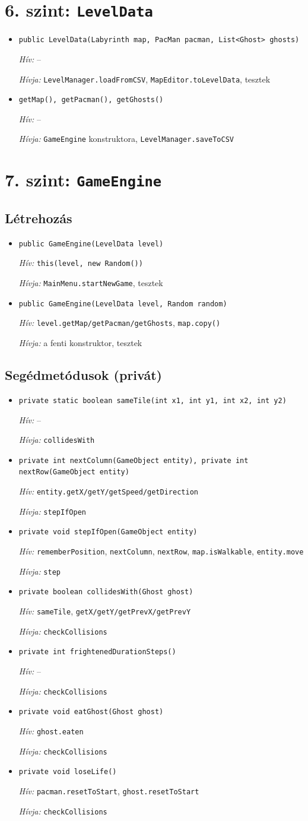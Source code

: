 \documentclass[10pt, a4paper]{article}
\newcommand{\fn}[3]{%
  \item \texttt{#1}\par
  {\small\textit{Hív:} #2\par\textit{Hívja:} #3}\vspace{3pt}}
\newcommand{\none}{--}
\begin{document}
\section{6. szint: \texttt{LevelData}}
\begin{itemize}
\fn{public LevelData(Labyrinth map, PacMan pacman, List<Ghost> ghosts)}{\none}{\texttt{LevelManager.loadFromCSV}, \texttt{MapEditor.toLevelData}, tesztek}
\fn{getMap(), getPacman(), getGhosts()}{\none}{\texttt{GameEngine} konstruktora, \texttt{LevelManager.saveToCSV}}
\end{itemize}

\section{7. szint: \texttt{GameEngine}}
\subsection*{Létrehozás}
\begin{itemize}
\fn{public GameEngine(LevelData level)}{\texttt{this(level, new Random())}}{\texttt{MainMenu.startNewGame}, tesztek}
\fn{public GameEngine(LevelData level, Random random)}{\texttt{level.getMap/getPacman/getGhosts}, \texttt{map.copy()}}{a fenti konstruktor, tesztek}
\end{itemize}
\subsection*{Segédmetódusok (privát)}
\begin{itemize}
\fn{private static boolean sameTile(int x1, int y1, int x2, int y2)}{\none}{\texttt{collidesWith}}
\fn{private int nextColumn(GameObject entity),\ private int nextRow(GameObject entity)}{\texttt{entity.getX/getY/getSpeed/getDirection}}{\texttt{stepIfOpen}}
\fn{private void stepIfOpen(GameObject entity)}{\texttt{rememberPosition}, \texttt{nextColumn}, \texttt{nextRow}, \texttt{map.isWalkable}, \texttt{entity.move}}{\texttt{step}}
\fn{private boolean collidesWith(Ghost ghost)}{\texttt{sameTile}, \texttt{getX/getY/getPrevX/getPrevY}}{\texttt{checkCollisions}}
\fn{private int frightenedDurationSteps()}{\none}{\texttt{checkCollisions}}
\fn{private void eatGhost(Ghost ghost)}{\texttt{ghost.eaten}}{\texttt{checkCollisions}}
\fn{private void loseLife()}{\texttt{pacman.resetToStart}, \texttt{ghost.resetToStart}}{\texttt{checkCollisions}}
\end{itemize}
\end{document}
